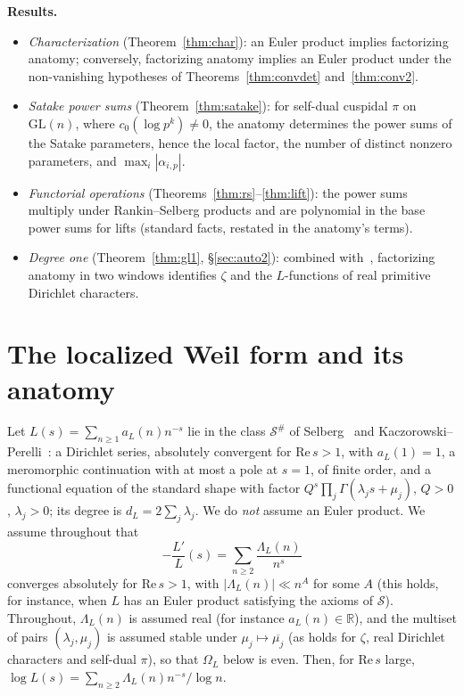 \documentclass[11pt]{amsart}
\theoremstyle{definition}
\theoremstyle{remark}
\newcommand{\cS}{\mathcal S}
\newcommand{\GL}{\mathrm{GL}}
\begin{document}
\medskip\noindent\textbf{Results.}
\begin{itemize}
\item[(I)] \emph{Characterization} (Theorem~\ref{thm:char}): an Euler product
implies factorizing anatomy; conversely, factorizing anatomy implies an Euler
product under the non-vanishing hypotheses of Theorems~\ref{thm:convdet}
and~\ref{thm:conv2}.
\item[(II)] \emph{Satake power sums} (Theorem~\ref{thm:satake}): for self-dual cuspidal $\pi$ on $\GL(n)$,
where $c_0(\log p^k)\ne0$, the anatomy determines the power sums of the Satake
parameters, hence the local factor, the number of distinct nonzero parameters,
and $\max_i|\alpha_{i,p}|$.
\item[(III)] \emph{Functorial operations} (Theorems~\ref{thm:rs}--\ref{thm:lift}):
the power sums multiply under Rankin--Selberg products and are polynomial in the
base power sums for lifts (standard facts, restated in the anatomy's terms).
\item[(IV)] \emph{Degree one} (Theorem~\ref{thm:gl1}, \S\ref{sec:auto2}):
combined with~\cite{KP1}, factorizing anatomy in two windows identifies $\zeta$ and the
$L$-functions of real primitive Dirichlet characters.
\end{itemize}

\section{The localized Weil form and its anatomy}\label{sec:setup}
Let $L(s)=\sum_{n\ge1}a_L(n)n^{-s}$ lie in the class $\cS^\#$ of
Selberg~\cite{Sel} and Kaczorowski--Perelli~\cite{KP1}: a Dirichlet series,
absolutely convergent for $\mathrm{Re}\,s>1$, with $a_L(1)=1$, a meromorphic
continuation with at most a pole at $s=1$, of finite order, and a functional
equation of the standard shape with factor
$Q^s\prod_j\Gamma(\lambda_js+\mu_j)$, $Q>0$, $\lambda_j>0$; its degree is $d_L=2\sum_j\lambda_j$. We do
\emph{not} assume an Euler product. We assume throughout that
\[
-\frac{L'}{L}(s)=\sum_{n\ge2}\frac{\Lambda_L(n)}{n^{s}}
\]
converges absolutely for $\mathrm{Re}\,s>1$, with $|\Lambda_L(n)|\ll n^{A}$ for
some $A$ (this holds, for instance, when $L$ has an Euler product satisfying
the axioms of $\cS$). Throughout, $\Lambda_L(n)$ is assumed real (for instance
$a_L(n)\in\mathbb R$), and the multiset of pairs $(\lambda_j,\mu_j)$ is assumed stable under $\mu_j\mapsto\overline{\mu_j}$ (as holds for $\zeta$, real Dirichlet characters and self-dual $\pi$), so that $\Omega_L$ below is even. Then, for
$\mathrm{Re}\,s$ large, $\log L(s)=\sum_{n\ge2}\Lambda_L(n)n^{-s}/\log n$.
\end{document}

